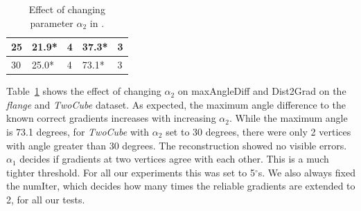 \begin{table}[h]
\begin{tabular}{|l|l|l|l|l|}
        25                                                                                    & 21.9*                                                               & 4                                                    & 37.3*                    & 3                                                    \\ \hline
        30                                                                                    & 25.0*                                                               & 4                                                    & 73.1*                    & 3                                                    \\ \hline
    \end{tabular}
    \caption{Effect of changing parameter $\alpha_{2}$ in \protect\ReliGrad.}
    \label{table:parameter}
\end{table}
Table~\ref{table:parameter} shows the effect of changing $\alpha_{2}$ on maxAngleDiff and Dist2Grad on the \textit{flange} and \textit{TwoCube} dataset. As expected, the maximum angle difference to the known correct gradients increases with increasing $\alpha_{2}$. While the maximum angle is 73.1 degrees, for \textit{TwoCube} with $\alpha_{2}$ set to 30 degrees, there were only 2 vertices with angle greater than 30 degrees. The \MergeSharp reconstruction showed no visible errors. 
 $\alpha_{1}$ decides if gradients at two vertices agree with each other. This is a much tighter threshold. For all our experiments this was set to 5$^{\circ}$s. We also always fixed the numIter, which decides how many times the reliable gradients are extended to 2, for all our tests. 
  
